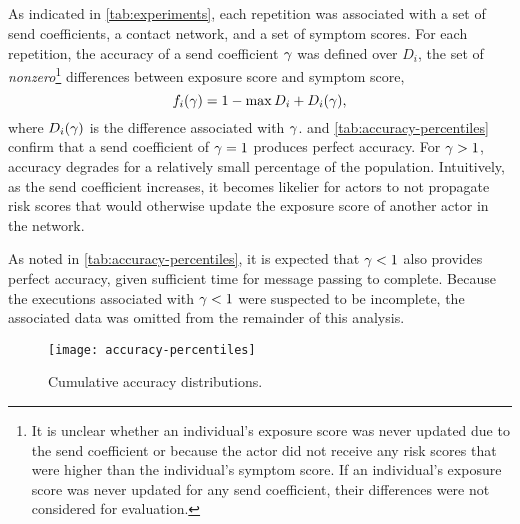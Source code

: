 \subsection{}\label{sec:parameters-experiment}

As indicated in \cref{tab:experiments}, each repetition was associated with a set of send coefficients, a contact network, and a set of symptom scores. For each repetition, the accuracy of a send coefficient $\gamma$ was defined over $D_i$, the set of \emph{nonzero}\footnote{It is unclear whether an individual's exposure score was never updated due to the send coefficient or because the actor did not receive any risk scores that were higher than the individual's symptom score. If an individual's exposure score was never updated for any send coefficient, their differences were not considered for evaluation.} differences between  exposure score and symptom score,
\begin{equation*}
  f_i(\gamma) = 1 - \max D_i + D_i(\gamma),
\end{equation*}
where $D_i(\gamma)$ is the difference associated with $\gamma$.  and \cref{tab:accuracy-percentiles} confirm that a send coefficient of $\gamma = 1$ produces perfect accuracy. For $\gamma > 1$, accuracy degrades for a relatively small percentage of the population. Intuitively, as the send coefficient increases, it becomes likelier for actors to not propagate risk scores that would otherwise update the exposure score of another actor in the network. 

As noted in \cref{tab:accuracy-percentiles}, it is expected that $\gamma < 1$ also provides perfect accuracy, given sufficient time for message passing to complete. Because the executions associated with $\gamma < 1$ were suspected to be incomplete, the associated data was omitted from the remainder of this analysis.

\begin{figure}[tbp]
  \centering
  \texttt{[image: accuracy-percentiles]}
  \caption[Cumulative accuracy distributions]{Cumulative accuracy distributions.}
  \label{fig:accuracy-percentiles}
\end{figure}

